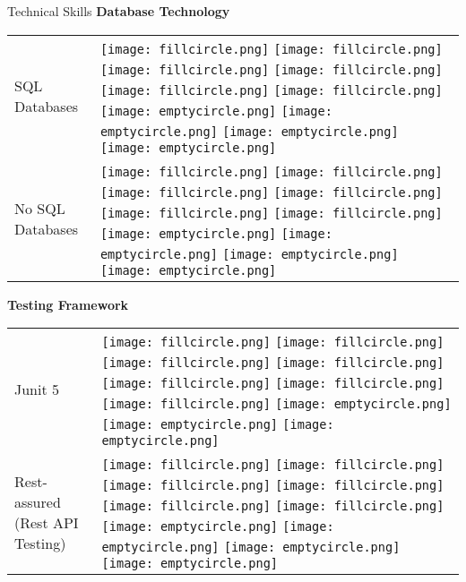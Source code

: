 \documentclass{resume}
\begin{document}
\begin{rSection}{Technical Skills}
{\bf Database Technology}
\begin{table}[h!]
  \begin{tabular}{p{10cm}p{6cm}}
 SQL Databases & 
 \texttt{[image: fillcircle.png]} 
 \texttt{[image: fillcircle.png]} 
 \texttt{[image: fillcircle.png]}
 \texttt{[image: fillcircle.png]} 
 \texttt{[image: fillcircle.png]}
 \texttt{[image: fillcircle.png]} 
 \texttt{[image: emptycircle.png]}
 \texttt{[image: emptycircle.png]} 
 \texttt{[image: emptycircle.png]} 
 \texttt{[image: emptycircle.png]} \\
 No SQL Databases & 
 \texttt{[image: fillcircle.png]} 
 \texttt{[image: fillcircle.png]} 
 \texttt{[image: fillcircle.png]}
 \texttt{[image: fillcircle.png]} 
 \texttt{[image: fillcircle.png]}
 \texttt{[image: fillcircle.png]} 
 \texttt{[image: emptycircle.png]}
 \texttt{[image: emptycircle.png]} 
 \texttt{[image: emptycircle.png]} 
 \texttt{[image: emptycircle.png]} \\
 \end{tabular}
\end{table}

{\bf Testing Framework}
\begin{table}[h!]
  \begin{tabular}{p{10cm}p{6cm}}
  Junit 5 & 
  \texttt{[image: fillcircle.png]} 
  \texttt{[image: fillcircle.png]} 
  \texttt{[image: fillcircle.png]}
  \texttt{[image: fillcircle.png]} 
  \texttt{[image: fillcircle.png]}
  \texttt{[image: fillcircle.png]} 
  \texttt{[image: fillcircle.png]}
  \texttt{[image: emptycircle.png]} 
  \texttt{[image: emptycircle.png]} 
  \texttt{[image: emptycircle.png]} \\
  Rest-assured (Rest API Testing) & 
  \texttt{[image: fillcircle.png]} 
  \texttt{[image: fillcircle.png]} 
  \texttt{[image: fillcircle.png]}
  \texttt{[image: fillcircle.png]} 
  \texttt{[image: fillcircle.png]}
  \texttt{[image: fillcircle.png]} 
  \texttt{[image: emptycircle.png]}
  \texttt{[image: emptycircle.png]} 
  \texttt{[image: emptycircle.png]} 
  \texttt{[image: emptycircle.png]} \\
  \end{tabular}
\end{table}


\end{rSection}
\end{document}
